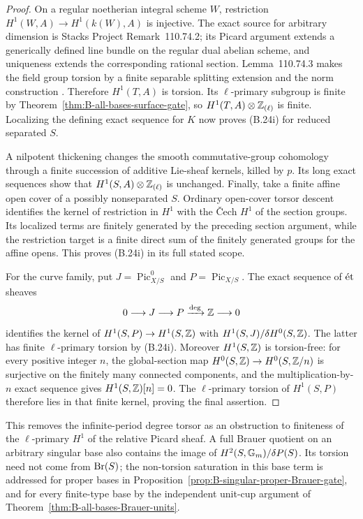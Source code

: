 \begin{proof}
On a regular noetherian integral scheme \(W\), restriction
\(H^1(W,A)\to H^1(k(W),A)\) is injective.  The exact
source for arbitrary dimension is Stacks Project
Remark~110.74.2; its Picard argument extends a generically
defined line bundle on the regular dual abelian scheme, and
uniqueness extends the corresponding rational section.
Lemma~110.74.3 makes the field group torsion by a finite
separable splitting extension and the norm construction
\cite{BStacksRegularTorsors}.
Therefore \(H^1(T,A)\) is torsion.  Its
\(\ell\)-primary subgroup is finite by
Theorem~\ref{thm:B-all-bases-surface-gate}, so
\(H^1(T,A)\otimes\mathbb Z_{(\ell)}\) is finite.
Localizing the defining exact sequence for \(K\) now proves
(B.24i) for reduced separated \(S\).

A nilpotent thickening changes the smooth commutative-group
cohomology through a finite succession of additive Lie-sheaf
kernels, killed by \(p\).  Its long exact sequences show
that \(H^1(S,A)\otimes\mathbb Z_{(\ell)}\) is unchanged.
Finally, take a finite affine open cover of a possibly
nonseparated \(S\).  Ordinary open-cover torsor descent
identifies the kernel of restriction in \(H^1\) with the
\v Cech \(H^1\) of the section groups.  Its localized terms
are finitely generated by the preceding section argument,
while the restriction target is a finite direct sum of the
finitely generated groups for the affine opens.  This proves
(B.24i) in its full stated scope.

For the curve family, put \(J=\operatorname{Pic}^0_{X/S}\)
and \(P=\operatorname{Pic}_{X/S}\).  The exact sequence
of \(\mathrm{\acute et}\) sheaves
\[
 0\longrightarrow J\longrightarrow P
       \xrightarrow{\deg}\mathbb Z\longrightarrow0
\]
identifies the kernel of \(H^1(S,P)\to H^1(S,\mathbb Z)\)
with \(H^1(S,J)/\delta H^0(S,\mathbb Z)\).
The latter has finite \(\ell\)-primary torsion by (B.24i).
Moreover \(H^1(S,\mathbb Z)\) is torsion-free: for every positive
integer \(n\), the global-section map
\(H^0(S,\mathbb Z)\to H^0(S,\mathbb Z/n)\) is surjective on the
finitely many connected components, and the multiplication-by-
\(n\) exact sequence gives \(H^1(S,\mathbb Z)[n]=0\).
The \(\ell\)-primary torsion of \(H^1(S,P)\) therefore
lies in that finite kernel, proving the final assertion.
\end{proof}

This removes the infinite-period degree torsor as an obstruction
to finiteness of the \(\ell\)-primary \(H^1\) of the
relative Picard sheaf.  A full Brauer quotient on an arbitrary
singular base also contains the image of
\(H^2(S,{\mathbb G_m})/\delta P(S)\).  Its torsion need not come
from \(\operatorname{Br}(S)\); the non-torsion saturation in this base
term is addressed for proper bases in
Proposition~\ref{prop:B-singular-proper-Brauer-gate}, and
for every finite-type base by the independent unit-cup
argument of Theorem~\ref{thm:B-all-bases-Brauer-units}.
